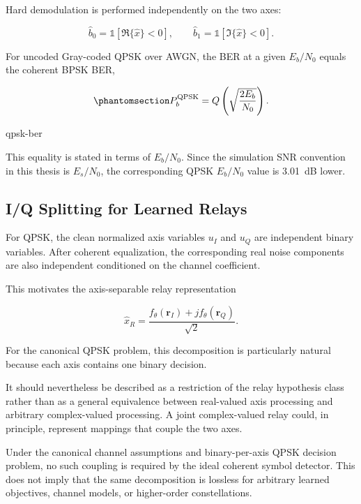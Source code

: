 Hard demodulation is performed independently on the two axes:

\[
\hat b_0
=
\mathbb{1}
\left[
\Re\{\hat x\}<0
\right],
\qquad
\hat b_1
=
\mathbb{1}
\left[
\Im\{\hat x\}<0
\right].
\]

For uncoded Gray-coded QPSK over AWGN, the BER at a given
$E_b/N_0$ equals the coherent BPSK BER,

\begin{equation}\protect\phantomsection\label{eq:qpsk-ber}
P_b^{\mathrm{QPSK}}
=
Q
\left(
\sqrt{\frac{2E_b}{N_0}}
\right).
\end{equation}
{\protect\numberline{\theequation}\quad qpsk-ber}

This equality is stated in terms of $E_b/N_0$. Since the simulation
SNR convention in this thesis is $E_s/N_0$, the corresponding QPSK
$E_b/N_0$ value is 3.01~dB lower.


\subsection{I/Q Splitting for Learned Relays}
\label{sec:iq-splitting-for-ai-relay-processing-of-complex-constellations}

For QPSK, the clean normalized axis variables $u_I$ and $u_Q$ are
independent binary variables. After coherent equalization, the
corresponding real noise components are also independent conditioned
on the channel coefficient.

This motivates the axis-separable relay representation

\[
\hat x_R
=
\frac{
f_\theta(\mathbf r_I)
+
j f_\theta(\mathbf r_Q)
}{\sqrt2}.
\]

For the canonical QPSK problem, this decomposition is particularly
natural because each axis contains one binary decision.

It should nevertheless be described as a restriction of the relay
hypothesis class rather than as a general equivalence between
real-valued axis processing and arbitrary complex-valued processing.
A joint complex-valued relay could, in principle, represent mappings
that couple the two axes.

Under the canonical channel assumptions and binary-per-axis QPSK
decision problem, no such coupling is required by the ideal coherent
symbol detector. This does not imply that the same decomposition is
lossless for arbitrary learned objectives, channel models, or
higher-order constellations.

